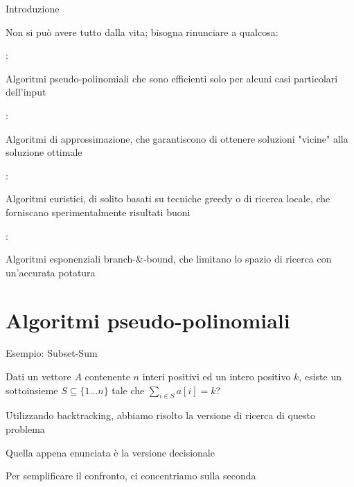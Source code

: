 \begin{frame}{Introduzione}


Non si può avere tutto dalla vita; bisogna rinunciare a qualcosa:

\smallskip
\BIL
\item {}: 
  \BI
  \item Algoritmi \alert{pseudo-polinomiali} che sono efficienti
    solo per alcuni casi particolari dell'input
  \EI
\item {}: 
  \BI
  \item Algoritmi di \alert{approssimazione}, che garantiscono di ottenere soluzioni "vicine" alla soluzione ottimale
  \EI
\item {}: 
  \BI
  \item Algoritmi \alert{euristici}, di solito basati su tecniche greedy o di ricerca locale, che forniscano sperimentalmente risultati buoni
  \EI
\item {}:
  \BI
  \item Algoritmi esponenziali \alert{branch-\&-bound}, che limitano lo spazio di ricerca con un'accurata potatura
  \EI
\EIL

\end{frame}


\section{Algoritmi pseudo-polinomiali}

\begin{frame}{Esempio: Subset-Sum}

\vspace{-9pt}
\begin{myboxtitle}
Dati un vettore $A$ contenente $n$ interi positivi ed un intero positivo $k$, \alert{esiste} un sottoinsieme $S \subseteq \{ 1 \ldots n\}$ tale che 
$\displaystyle \sum_{i \in S} a[i] = k$?
\end{myboxtitle}

\begin{overprint}
\BIL
\item Utilizzando \alert{backtracking}, abbiamo risolto la \alert{versione di ricerca} di questo problema
\item Quella appena enunciata è la \alert{versione decisionale}
\item Per semplificare il confronto, ci concentriamo sulla seconda
\EIL
\end{overprint}

\end{frame}



